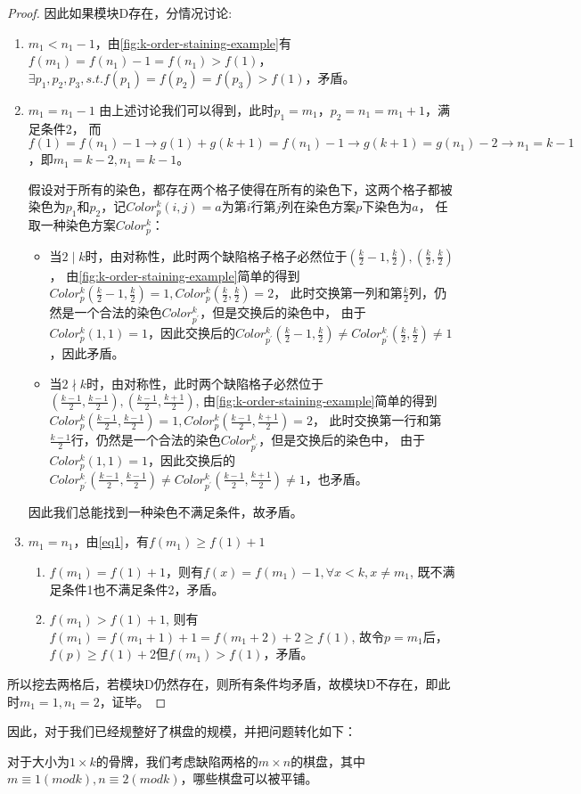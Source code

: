 \begin{proof}
    因此如果模块D存在，分情况讨论:

    \begin{enumerate}
        \item $m_1 < n_1 - 1$，由\ref{fig:k-order-staining-example}有$f(m_1) = f(n_1) - 1 = f(n_1) > f(1)$，$\exists p_1, p_2, p_3, s.t. f(p_1) = f(p_2) = f(p_3) > f(1)$，矛盾。
        \item $m_1 = n_1 - 1$ 由上述讨论我们可以得到，此时$p_1 = m_1$，$p_2 = n_1 = m_1 + 1$，满足条件2，
        而$f(1) = f(n_1) - 1 \rightarrow g(1) + g(k + 1) = f(n_1) - 1 \rightarrow g(k + 1) = g(n_1) - 2 \rightarrow n_1 = k - 1$，即$m_1 = k - 2, n_1 = k - 1$。

              假设对于所有的染色，都存在两个格子使得在所有的染色下，这两个格子都被染色为$p_1$和$p_2$，记$Color^k_p(i, j) = a$为第$i$行第$j$列在染色方案$p$下染色为$a$，
              任取一种染色方案$Color^k_p$：
              \begin{itemize}
                \item 当$2 \mid k$时，由对称性，此时两个缺陷格子格子必然位于$(\frac{k}{2} - 1,\frac{k}{2}), (\frac{k}{2},\frac{k}{2})$，
                由\ref{fig:k-order-staining-example}简单的得到$Color^k_p(\frac{k}{2} - 1,\frac{k}{2}) = 1, Color^k_p(\frac{k}{2},\frac{k}{2}) = 2$，
                此时交换第一列和第$\frac{k}{2}$列，仍然是一个合法的染色$Color^k_{p^{'}}$，但是交换后的染色中，
                由于$Color^k_p(1, 1) = 1$，因此交换后的$Color^k_{p^{'}}(\frac{k}{2} - 1,\frac{k}{2}) \neq Color^k_{p^{'}}(\frac{k}{2},\frac{k}{2}) \neq 1$，因此矛盾。
                \item 当$2 \nmid k$时，由对称性，此时两个缺陷格子必然位于$(\frac{k - 1}{2},\frac{k - 1}{2}), (\frac{k - 1}{2},\frac{k + 1}{2})$,
                由\ref{fig:k-order-staining-example}简单的得到$Color^k_p(\frac{k - 1}{2},\frac{k - 1}{2}) = 1, Color^k_p(\frac{k - 1}{2},\frac{k + 1}{2}) = 2$，
                此时交换第一行和第$\frac{k - 1}{2}$行，仍然是一个合法的染色$Color^k_{p^{'}}$，但是交换后的染色中，
                由于$Color^k_p(1, 1) = 1$，因此交换后的$Color^k_{p^{'}}(\frac{k - 1}{2},\frac{k - 1}{2}) \neq Color^k_{p^{'}}(\frac{k - 1}{2},\frac{k + 1}{2}) \neq 1$，也矛盾。
              \end{itemize}
              因此我们总能找到一种染色不满足条件，故矛盾。
        \item $m_1 = n_1$，由\ref{eq1}，有$f(m_1) \ge f(1) + 1$
              \begin{enumerate}
                  \item $f(m_1) = f(1) + 1$，则有$f(x) = f(m_1) - 1, \forall x < k, x \neq m_1$, 既不满足条件1也不满足条件2，矛盾。
                  \item $f(m_1) > f(1) + 1$, 则有$f(m_1) = f(m_1 + 1) + 1 = f(m_1 + 2) + 2 \ge f(1)$, 故令$p = m_1$后，$f(p) \ge f(1) + 2$但$f(m_1) > f(1)$，矛盾。
              \end{enumerate}
    \end{enumerate}

    所以挖去两格后，若模块D仍然存在，则所有条件均矛盾，故模块D不存在，即此时$m_1 = 1, n_1 = 2$，证毕。
\end{proof}

因此，对于我们已经规整好了棋盘的规模，并把问题转化如下：

对于大小为$1 \times k$的骨牌，我们考虑缺陷两格的$m \times n$的棋盘，其中$m \equiv 1 (mod k), n \equiv 2 (mod k)$，哪些棋盘可以被平铺。

\clearpage